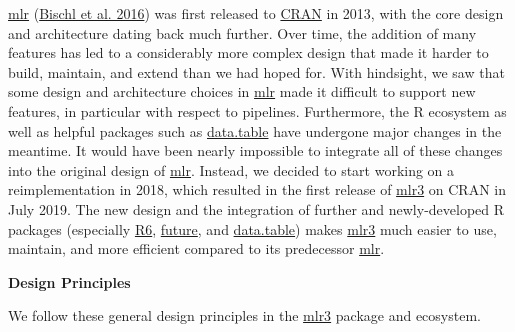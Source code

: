 \documentclass[
]{scrbook}
\begin{document}
\href{https://mlr.mlr-org.com}{mlr} (\protect\hyperlink{ref-mlr}{Bischl et al. 2016}) was first released to \href{https://cran.r-project.org}{CRAN} in 2013, with the core design and architecture dating back much further.
Over time, the addition of many features has led to a considerably more complex design that made it harder to build, maintain, and extend than we had hoped for.
With hindsight, we saw that some design and architecture choices in \href{https://mlr.mlr-org.com}{mlr} made it difficult to support new features, in particular with respect to pipelines.
Furthermore, the R ecosystem as well as helpful packages such as \href{https://cran.r-project.org/package=data.table}{data.table} have undergone major changes in the meantime.
It would have been nearly impossible to integrate all of these changes into the original design of \href{https://mlr.mlr-org.com}{mlr}.
Instead, we decided to start working on a reimplementation in 2018, which resulted in the first release of \href{https://mlr3.mlr-org.com}{mlr3} on CRAN in July 2019.
The new design and the integration of further and newly-developed R packages (especially \href{https://cran.r-project.org/package=R6}{R6}, \href{https://cran.r-project.org/package=future}{future}, and \href{https://cran.r-project.org/package=data.table}{data.table}) makes \href{https://mlr3.mlr-org.com}{mlr3} much easier to use, maintain, and more efficient compared to its predecessor \href{https://mlr.mlr-org.com}{mlr}.

\textbf{Design Principles}

We follow these general design principles in the \href{https://mlr3.mlr-org.com}{mlr3} package and ecosystem.
\end{document}
